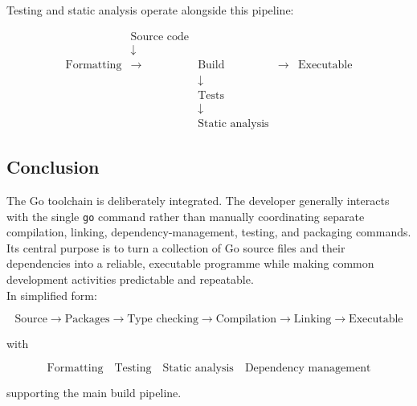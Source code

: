 Testing and static analysis operate alongside this pipeline:

\[
\begin{array}{ccccc}
& \text{Source code} & & &\\
& \downarrow & & &\\
\text{Formatting} & \rightarrow & \text{Build} & \rightarrow &
\text{Executable}\\
& & \downarrow & &\\
& & \text{Tests} & &\\
& & \downarrow & &\\
& & \text{Static analysis} & &
\end{array}
\]

\subsection{Conclusion}

The Go toolchain is deliberately integrated.  The developer generally
interacts with the single \texttt{go} command rather than manually
coordinating separate compilation, linking, dependency-management,
testing, and packaging commands.\\

Its central purpose is to turn a collection of Go source files and
their dependencies into a reliable, executable programme while making
common development activities predictable and repeatable.\\

In simplified form:

\[
\boxed{
\text{Source}
\rightarrow
\text{Packages}
\rightarrow
\text{Type checking}
\rightarrow
\text{Compilation}
\rightarrow
\text{Linking}
\rightarrow
\text{Executable}
}
\]

with

\[
\boxed{
\text{Formatting}
\quad
\text{Testing}
\quad
\text{Static analysis}
\quad
\text{Dependency management}
}
\]

supporting the main build pipeline.